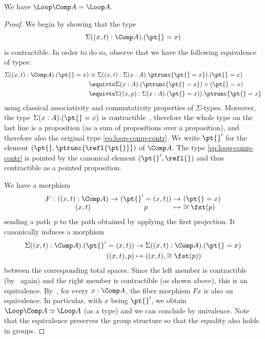 \begin{lemma}
  \label{loop-comp}
  We have $\Loop\Comp A=\Loop A$.
\end{lemma}
\begin{proof}
  We begin by showing that the type
  \begin{equation}
    \label{eq:loop-comp-contr}
    \Sigma((x,t):\Comp A).(\pt{}=x)
  \end{equation}
  is contractible. In order to do so, observe that we have the following
  equivalence of types:
  \begin{align*}
    \Sigma((x,t):\Comp A).(\pt{}=x)
    &\simeq
    \Sigma((x,t):\Sigma(x:A).\ptrunc{\pt{}=x}).(\pt{}=x)
    \\
    &\equivto
    \Sigma(x:A).(\ptrunc{\pt{}=x})\times(\pt{}=x)
    \\
    &\equivto
    \Sigma((x,p):\Sigma(x:A).(\pt{}=x)).\ptrunc{\pt{}=x}
  \end{align*}
  using classical associativity and commutativity properties of
  $\Sigma$-types. Moreover, the type $\Sigma(x:A).(\pt{}=x)$ is
  contractible~\cite[Lemma~3.11.8]{hottbook}, therefore the whole type on the
  last line is a proposition (as a sum of propositions over a proposition), and
  therefore also the original type \cref{eq:loop-comp-contr}. We write $\pt{}'$
  for the element $(\pt{},\ptrunc{\refl{\pt{}}})$ of $\Comp A$. The type
  \cref{eq:loop-comp-contr} is pointed by the canonical element
  $(\pt{}',\refl{})$ and thus contractible as a pointed proposition.

  We have a morphism
  \[
    \begin{array}{r@{\ }c@{\ }c@{\ }c@{\ }c@{\ }l}
      F:&((x,t):\Comp A)&\to&(\pt{}'=(x,t))&\to&(\pt{}=x)\\
      &(x,t)&&p&\mapsto&\cong\fst(p)
    \end{array}
  \]
  sending a path~$p$ to the path obtained by applying the first projection. It
  canonically induces a morphism
  \begin{align*}
    \Sigma((x,t):\Comp A).(\pt{}'=(x,t))&\to\Sigma((x,t):\Comp A).(\pt{}=x)\\
    ((x,t),p)&\mapsto((x,t),\cong\fst(p))
  \end{align*}
  between the corresponding total spaces. Since the left member is contractible
  (by~\cite[Lemma~3.11.8]{hottbook} again) and the right member is contractible
  (as shown above), this is an equivalence. By~\cite[Theorem~4.7.7]{hottbook},
  for every $x:\Comp A$, the fiber morphism $F x$ is also an equivalence. In
  particular, with $x$ being $\pt{}'$, we obtain $\Loop\Comp A\simeq\Loop A$ (as
  a type) and we can conclude by univalence. Note that the equivalence preserves
  the group structure so that the equality also holds in groups.
\end{proof}

